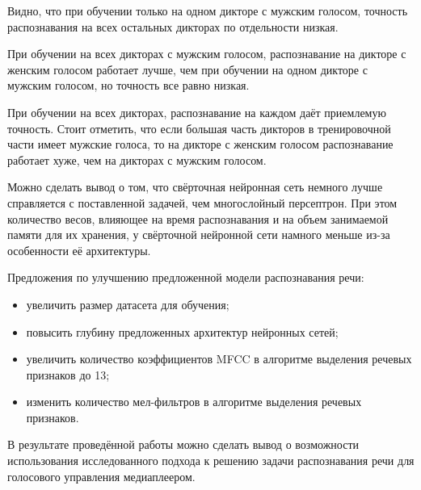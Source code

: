 Видно, что при обучении только на одном дикторе с мужским голосом, точность распознавания на всех остальных дикторах по отдельности низкая. 

При обучении на всех дикторах с мужским голосом, распознавание на дикторе с женским голосом работает лучше, чем при обучении на одном дикторе с мужским голосом, но точность все равно низкая.

При обучении на всех дикторах, распознавание на каждом даёт приемлемую точность. Стоит отметить, что если большая часть дикторов в тренировочной части имеет мужские голоса, то на дикторе с женским голосом распознавание работает хуже, чем на дикторах с мужским голосом.

Можно сделать вывод о том, что свёрточная нейронная сеть немного лучше справляется с поставленной задачей, чем многослойный персептрон. При этом количество весов, влияющее на время распознавания и на объем занимаемой памяти для их хранения, у свёрточной нейронной сети намного меньше из-за особенности её архитектуры.

Предложения по улучшению предложенной модели распознавания речи:
\begin{itemize}[leftmargin=2cm]
	\item увеличить размер датасета для обучения;
	\item повысить глубину предложенных архитектур нейронных сетей;
	\item увеличить количество коэффициентов MFCC в алгоритме выделения речевых признаков до 13;
	\item изменить количество мел-фильтров в алгоритме выделения речевых признаков.
\end{itemize}

В результате проведённой работы можно сделать вывод о возможности использования исследованного подхода к решению задачи распознавания речи для голосового управления медиаплеером.